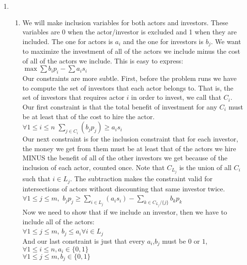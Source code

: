 \documentclass[11pt]{article}
\begin{document}
\begin{enumerate}
\newpage
\item
\begin{enumerate}
\item
We will make inclusion variables for both actors and investors. These variables are $0$ when the actor/investor is excluded and 1 when they are included. The one for actors is $a_i$ and the one for investors is $b_j$. We want to maximize the investment of all of the actors we include minus the cost of all of the actors we include. This is easy to express:\\
$\max \sum b_ip_i - \sum a_is_i$\\
Our constraints are more subtle. First, before the problem runs we have to compute the set of investors that each actor belongs to. That is, the set of investors that requires actor $i$ in order to invest, we call that $C_i$. Our first constraint is that the total benefit of investment for any $C_i$ must be at least that of the cost to hire the actor.\\
$\forall 1 \le i \le n$ $\sum_{j\in C_i}\left (b_jp_j \right )\ge a_is_i$\\
Our next constraint is for the inclusion constraint that for each investor, the money we get from them must be at least that of the actors we hire MINUS the benefit of all of the other investors we get because of the inclusion of each actor, counted once. Note that $C_{L_j}$ is the union of all $C_i$ such that $i\in L_j$. The subtraction makes the constraint valid for intersections of actors without discounting that same investor twice.\\
$\forall 1 \le j \le m,$ $b_jp_j \ge \sum_{i\in L_j}\left (a_is_i \right ) - \sum_{k\in C_{L_j}/\{j\}} b_kp_k$\\
Now we need to show that if we include an investor, then we have to include all of the actors:\\
$\forall 1 \le j \le m$, $b_j \le a_i \forall i \in L_j$\\
And our last constraint is just that every $a_i$,$b_j$ must be $0$ or $1$,\\
$\forall 1 \le i \le n, a_i\in \{0,1\}$\\
$\forall 1 \le j \le m, b_j\in \{0,1\}$\\

\end{enumerate}
\end{enumerate}
\end{document}
